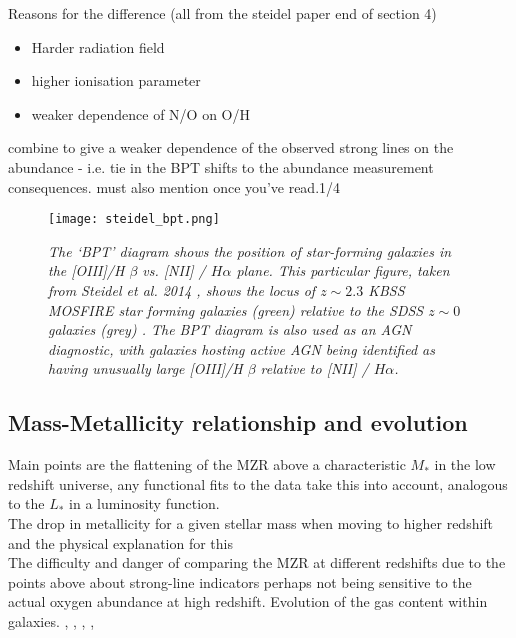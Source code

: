 \documentclass{literature}
\begin{document}
Reasons for the difference (all from the steidel paper end of section 4)
\begin{itemize}
	\item Harder radiation field 
	\item higher ionisation parameter 
	\item weaker dependence of N/O on O/H
\end{itemize}
combine to give a weaker dependence of the observed strong lines on the abundance - i.e. tie in the BPT shifts to the abundance measurement consequences. 
must also mention \citep{Kewley2013} once you've read.1/4

\begin{figure}[!htp]
\centering
\texttt{[image: steidel\_bpt.png]}
\caption{\footnotesize{\emph{The `BPT' diagram shows the position of star-forming galaxies in the [OIII]/H $\beta$ vs. [NII] / $H\alpha$ plane. This particular figure, taken from Steidel et al. 2014 \citep{Steidel2014}, shows the locus of $z \sim 2.3$ KBSS MOSFIRE star forming galaxies (green) relative to the SDSS $z \sim 0$ galaxies (grey) \citep{Tremonti2004}. The BPT diagram is also used as an AGN diagnostic, with galaxies hosting active AGN being identified as having unusually large [OIII]/H $\beta$ relative to [NII] / $H\alpha$.}}}
\label{fig:steidel_bpt}
\end{figure} 

\subsection{Mass-Metallicity relationship and evolution}\label{subsec:MZ-relation}

Main points are the flattening of the MZR above a characteristic $M_{*}$ in the low redshift universe, any functional fits to the data take this into account, analogous to the $L_{*}$ in a luminosity function. \\ 
The drop in metallicity for a given stellar mass when moving to higher redshift and the physical explanation for this \\ 
The difficulty and danger of comparing the MZR at different redshifts due to the points above about strong-line indicators perhaps not being sensitive to the actual oxygen abundance at high redshift. Evolution of the gas content within galaxies. 
\citep{Savaglio2005}, \citep{Maiolino2008}, \citep{Erb_2006}, \citep{Tremonti2004}, \citep{Kewley2013}

\begin{figure}[!htp]
\centering
{}
\caption{\footnotesize{\emph{}}}
\label{fig:steidel_mzr}
\end{figure}
\end{document}
